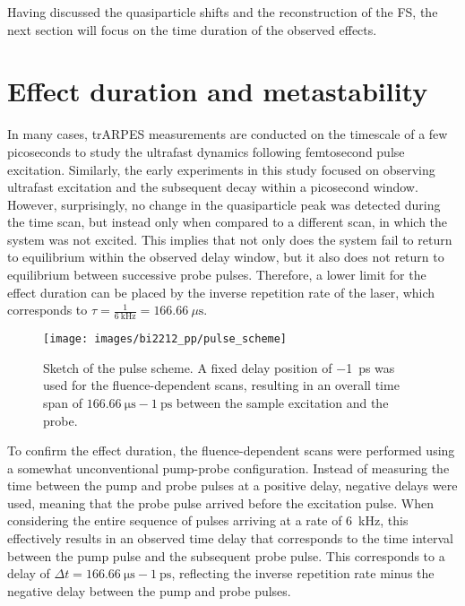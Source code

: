 Having discussed the quasiparticle shifts and the reconstruction of the FS, the next section will focus on the time duration of the observed effects.

\section{Effect duration and metastability}
\label{sec:bi2212_meta}

In many cases, trARPES measurements are conducted on the timescale of a few picoseconds to study the ultrafast dynamics following femtosecond pulse excitation.
Similarly, the early experiments in this study focused on observing ultrafast excitation and the subsequent decay within a picosecond window.
However, surprisingly, no change in the quasiparticle peak was detected during the time scan, but instead only when compared to a different scan, in which the system was not excited.
This implies that not only does the system fail to return to equilibrium within the observed delay window, but it also does not return to equilibrium between successive probe pulses.
Therefore, a lower limit for the effect duration can be placed by the inverse repetition rate of the laser, which corresponds to $\tau=\frac{1}{\qty{6}{\kilo\hertz}}=\qty{166.66}{\mu\second}$.

\begin{figure}[bh!]
	\centering
	\texttt{[image: images/bi2212\_pp/pulse\_scheme]}
	\caption{Sketch of the pulse scheme. A fixed delay position of \qty{-1}{\pico\second} was used for the fluence-dependent scans, resulting in an overall time span of $\qty{166.66}{\micro\second}-\qty{1}{\pico\second}$ between the sample excitation and the probe.}
	\label{fig:pulsescheme}
\end{figure}

To confirm the effect duration, the fluence-dependent scans were performed using a somewhat unconventional pump-probe configuration.
Instead of measuring the time between the pump and probe pulses at a positive delay, negative delays were used, meaning that the probe pulse arrived before the excitation pulse.
When considering the entire sequence of pulses arriving at a rate of \qty{6}{\kilo\hertz}, this effectively results in an observed time delay that corresponds to the time interval between the pump pulse and the subsequent probe pulse.
This corresponds to a delay of $\Delta t = \qty{166.66}{\micro\second} - \qty{1}{\pico\second}$, reflecting the inverse repetition rate minus the negative delay between the pump and probe pulses.

